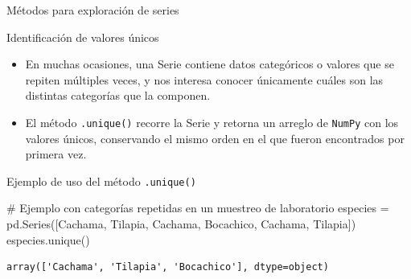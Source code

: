 \documentclass[
  ignorenonframetext,
  aspectratio=169,
  spanish,
]{beamer}
\newenvironment{Shaded}{\begin{snugshade}}{\end{snugshade}}
\newcommand{\CommentTok}[1]{\textcolor[rgb]{0.37,0.37,0.37}{#1}}
\newcommand{\NormalTok}[1]{\textcolor[rgb]{0.00,0.23,0.31}{#1}}
\newcommand{\OperatorTok}[1]{\textcolor[rgb]{0.37,0.37,0.37}{#1}}
\newcommand{\StringTok}[1]{\textcolor[rgb]{0.13,0.47,0.30}{#1}}
\begin{document}
\begin{frame}[fragile]{Métodos para exploración de series}
\begin{block}{Identificación de valores únicos}
\label{identificaciuxf3n-de-valores-uxfanicos}

\begin{itemize}
\item
  En muchas ocasiones, una Serie contiene datos categóricos o valores
  que se repiten múltiples veces, y nos interesa conocer únicamente
  cuáles son las distintas categorías que la componen.
\item
  El método \texttt{.unique()} recorre la Serie y retorna un arreglo de
  \texttt{NumPy} con los valores únicos, conservando el mismo orden en
  el que fueron encontrados por primera vez.
\end{itemize}
\end{block}

\begin{block}{Ejemplo de uso del método \texttt{.unique()}}
\label{ejemplo-de-uso-del-muxe9todo-.unique}
\begin{Shaded}
\begin{Highlighting}[]
\CommentTok{\# Ejemplo con categorías repetidas en un muestreo de laboratorio}
\NormalTok{especies }\OperatorTok{=}\NormalTok{ pd.Series([}\StringTok{\textquotesingle{}Cachama\textquotesingle{}}\NormalTok{, }\StringTok{\textquotesingle{}Tilapia\textquotesingle{}}\NormalTok{,}
              \StringTok{\textquotesingle{}Cachama\textquotesingle{}}\NormalTok{, }\StringTok{\textquotesingle{}Bocachico\textquotesingle{}}\NormalTok{,}
              \StringTok{\textquotesingle{}Cachama\textquotesingle{}}\NormalTok{, }\StringTok{\textquotesingle{}Tilapia\textquotesingle{}}\NormalTok{])}
\NormalTok{especies.unique() }
\end{Highlighting}
\end{Shaded}

\begin{verbatim}
array(['Cachama', 'Tilapia', 'Bocachico'], dtype=object)
\end{verbatim}
\end{block}
\end{frame}
\end{document}
